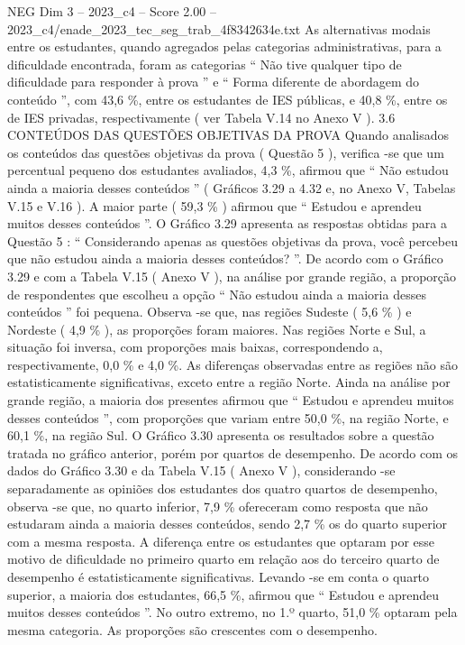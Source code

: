 \begin{textsample}{NEG Dim 3 – 2023\_c4 – Score 2.00 – 2023\_c4/enade\_2023\_tec\_seg\_trab\_4f8342634e.txt}
As alternativas modais entre os estudantes, quando agregados pelas categorias administrativas, para a dificuldade encontrada, foram as categorias “ Não tive qualquer tipo de dificuldade para responder à prova ” e “ Forma diferente de abordagem do conteúdo ”, com 43,6 \%, entre os estudantes de IES públicas, e 40,8 \%, entre os de IES privadas, respectivamente ( ver Tabela V.14 no Anexo V ). 3.6 CONTEÚDOS DAS QUESTÕES OBJETIVAS DA PROVA Quando analisados os conteúdos das questões objetivas da prova ( Questão 5 ), verifica -se que um percentual pequeno dos estudantes avaliados, 4,3 \%, afirmou que “ Não estudou ainda a maioria desses conteúdos ” ( Gráficos 3.29 a 4.32 e, no Anexo V, Tabelas V.15 e V.16 ).
A maior parte ( 59,3 \% ) afirmou que “ Estudou e aprendeu muitos desses conteúdos ”.
O Gráfico 3.29 apresenta as respostas obtidas para a Questão 5 : “ Considerando apenas as questões objetivas da prova, você percebeu que não estudou ainda a maioria desses conteúdos? ”.
De acordo com o Gráfico 3.29 e com a Tabela V.15 ( Anexo V ), na análise por grande região, a proporção de respondentes que escolheu a opção “ Não estudou ainda a maioria desses conteúdos ” foi pequena.
Observa -se que, nas regiões Sudeste ( 5,6 \% ) e Nordeste ( 4,9 \% ), as proporções foram maiores.
Nas regiões Norte e Sul, a situação foi inversa, com proporções mais baixas, correspondendo a, respectivamente, 0,0 \% e 4,0 \%.
As diferenças observadas entre as regiões não são estatisticamente significativas, exceto entre a região Norte.
Ainda na análise por grande região, a maioria dos presentes afirmou que “ Estudou e aprendeu muitos desses conteúdos ”, com proporções que variam entre 50,0 \%, na região Norte, e 60,1 \%, na região Sul.
O Gráfico 3.30 apresenta os resultados sobre a questão tratada no gráfico anterior, porém por quartos de desempenho.
De acordo com os dados do Gráfico 3.30 e da Tabela V.15 ( Anexo V ), considerando -se separadamente as opiniões dos estudantes dos quatro quartos de desempenho, observa -se que, no quarto inferior, 7,9 \% ofereceram como resposta que não estudaram ainda a maioria desses conteúdos, sendo 2,7 \% os do quarto superior com a mesma resposta.
A diferença entre os estudantes que optaram por esse motivo de dificuldade no primeiro quarto em relação aos do terceiro quarto de desempenho é estatisticamente significativas.
Levando -se em conta o quarto superior, a maioria dos estudantes, 66,5 \%, afirmou que “ Estudou e aprendeu muitos desses conteúdos ”.
No outro extremo, no 1.º quarto, 51,0 \% optaram pela mesma categoria.
As proporções são crescentes com o desempenho.

\end{textsample}
